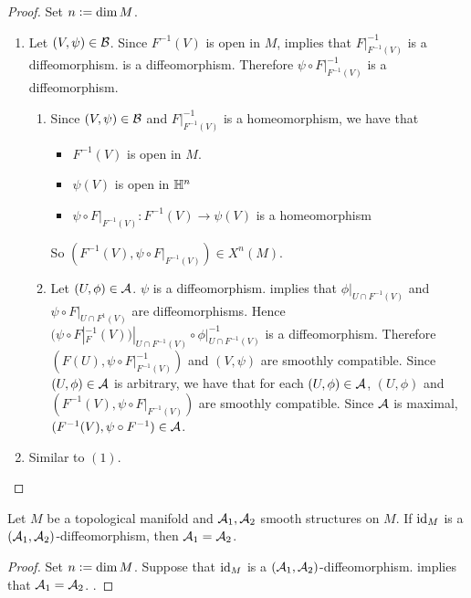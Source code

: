 \documentclass{book}
\begin{document}
\begin{proof} Set $n \vcentcolon= \dim M$. 
	\begin{enumerate}
		\item Let $(V, \psi) \in \mathcal{B}$. Since $F^{-1}(V)$ is open in $M$,  implies that $F|_{F^{-1}(V)}^{-1}$ is a diffeomorphism.  is a diffeomorphism. Therefore $\psi \circ F|_{F^{-1}(V)}^{-1}$ is a diffeomorphism.
		\begin{enumerate}
			\item Since $(V, \psi) \in \mathcal{B}$ and $F|_{F^{-1}(V)}^{-1}$ is a homeomorphism, we have that
			\begin{itemize}
				\item $F^{-1}(V)$ is open in $M$.
				\item $\psi(V)$ is open in $\mathbb{H}^n$
				\item $\psi \circ F|_{F^{-1}(V)}: F^{-1}(V)  \rightarrow \psi(V)$ is a homeomorphism
			\end{itemize}
			So $(F^{-1}(V), \psi \circ F|_{F^{-1}(V)}) \in X^n(M)$. 
			\item Let $(U, \phi) \in \mathcal{A}$.  $\psi$ is a diffeomorphism.  implies that $\phi|_{U \cap F^{-1}(V)}$ and $\psi \circ F|_{U \cap F^{1}(V)}$ are diffeomorphisms. Hence $(\psi \circ F|_F^{-1}(V))|_{U \cap F^{-1}(V)} \circ \phi|_{U \cap F^{-1}(V)}^{-1}$ is a diffeomorphism. Therefore $(F(U), \psi \circ F|_{F^{-1}(V)}^{-1})$ and $(V, \psi)$ are smoothly compatible. Since $(U, \phi) \in \mathcal{A}$ is arbitrary, we have that for each $(U, \phi) \in \mathcal{A}$, $(U, \phi)$ and $(F^{-1}(V), \psi \circ F|_{F^{-1}(V)})$ are smoothly compatible. Since $\mathcal{A}$ is maximal, $(F^{-1}(V), \psi \circ F^{-1}) \in \mathcal{A}$.
		\end{enumerate}
		\item Similar to $(1)$.
	\end{enumerate}
\end{proof}

\begin{ex} 
	Let $M$ be a topological manifold and $\mathcal{A}_1, \mathcal{A}_2$ smooth structures on $M$. If $\operatorname{id}_M$ is a $(\mathcal{A}_1, \mathcal{A}_2)$-diffeomorphism, then $\mathcal{A}_1 = \mathcal{A}_2$.
\end{ex}

\begin{proof} Set $n \vcentcolon= \dim M$. 
	Suppose that $\operatorname{id}_M$ is a $(\mathcal{A}_1, \mathcal{A}_2)$-diffeomorphism.  implies that $\mathcal{A}_1 = \mathcal{A}_2$. .
\end{proof}
\end{document}
